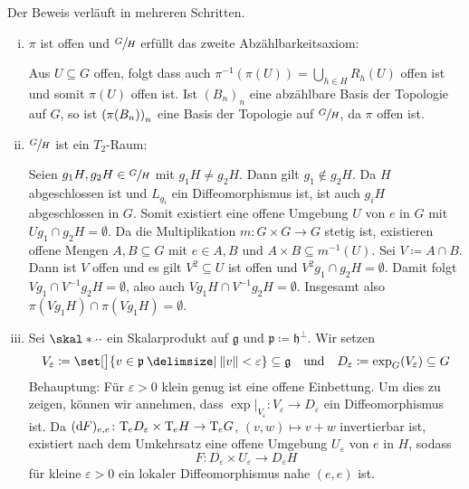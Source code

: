 \begin{beweis}
	Der Beweis verläuft in mehreren Schritten.
	\begin{enumerate}[(i)]
		\item $\pi$ ist offen und $\sfrac{G}{H}$ erfüllt das zweite Abzählbarkeitsaxiom:
		
		Aus $U \subseteq G $ offen, folgt dass auch $\pi^{-1}(\pi(U)) = \bigcup_{h \in H} R_h(U)$ offen ist und somit $\pi(U)$ offen ist.
		Ist $(B_n)_n$ eine abzählbare Basis der Topologie auf $G$, so ist $\enbrace*{\pi(B_n)}_n$ eine Basis der Topologie auf $\sfrac{G}{H}$, da $\pi$ offen ist.
		\item $\sfrac{G}{H}$ ist ein $T_2$-Raum:
		
		Seien $g_1 H, g_2 H \in \sfrac{G}{H}$ mit $g_1 H \neq g_2 H$.
		Dann gilt $g_1 \notin g_2 H$.
		Da $H$ abgeschlossen ist und $L_{g_i}$ ein Diffeomorphismus ist, ist auch $g_i H$ abgeschlossen in $G$.
		Somit existiert eine offene Umgebung $U$ von $e$ in $G$ mit $U g_1 \cap g_2 H = \emptyset$.
		Da die Multiplikation $m \colon G \times G \to G$ stetig ist, existieren offene Mengen $A,B \subseteq G$ mit $e \in A,B$ und $A \times B \subseteq m^{-1}(U)$.
		Sei $V \coloneqq A \cap B$.
		Dann ist $V$ offen und es gilt $V^2 \subseteq U$ ist offen und $V^2 g_1 \cap g_2 H = \emptyset$.
		Damit folgt $V g_1 \cap V^{-1} g_2 H = \emptyset$, also auch $V g_1 H \cap V^{-1} g_2 H = \emptyset$.
		Insgesamt also $\pi(V g_1 H) \cap \pi(V g_1 H) = \emptyset$.
		\item Sei $\skal*{\cdot }{\cdot }$ ein Skalarprodukt auf $\mathfrak{g}$ und $\mathfrak{p} \coloneqq \mathfrak{h}^\bot$.
		Wir setzen 
		\[
			V_\varepsilon \coloneqq \set[\big]{v \in \mathfrak{p} \given \norm*{v} < \varepsilon} \subseteq \mathfrak{g} \quad \text{und} \quad D_\varepsilon \coloneqq \exp_G(V_\varepsilon) \subseteq G 
		\] 
		Behauptung: Für $\varepsilon>0$ klein genug ist 
		eine offene Einbettung. 
		Um dies zu zeigen, können wir annehmen, dass $\exp|_{V_\varepsilon} \colon V_\varepsilon \to D_\varepsilon$ ein Diffeomorphismus ist.
		Da $(\mathd F)_{e,e} \colon \Tmap_e D_\varepsilon \times \Tmap_e H \to \Tmap_e G$, $(v,w) \mapsto v+w$ invertierbar ist, existiert nach dem Umkehrsatz eine offene Umgebung $U_\varepsilon$ von $e$ in $H$, sodass 
		\begin{equation}
			F \colon D_\varepsilon \times U_\varepsilon \to D_\varepsilon H \label{ep:32:1}\tag{*}
		\end{equation}
		für kleine $\varepsilon>0$ ein lokaler Diffeomorphismus nahe $(e,e)$ ist.

\end{enumerate}
\end{beweis}
